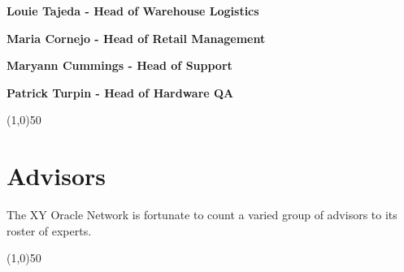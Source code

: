 \documentclass{article}
\begin{document}
\begin {framed}
\begin {center}
\textbf{Louie Tajeda - Head of Warehouse Logistics}
\end {center}
\end {framed}


\begin {framed}
\begin {center}
\textbf{Maria Cornejo - Head of Retail Management}
\end {center}
\end {framed}

\begin {framed}
\begin {center}
\textbf{Maryann Cummings - Head of Support}
\end {center}
\end {framed}

\begin {framed}
\begin {center}
\textbf{Patrick Turpin - Head of Hardware QA}
\end {center}
\end {framed}

\begin{center}
\line(1,0){50}
\end{center}

\section {Advisors}
The XY Oracle Network is fortunate to count a varied group of advisors to its roster of experts.

\begin{center}
\line(1,0){50}
\end{center}

\clearpage
 
\printglossaries
\end{document}
